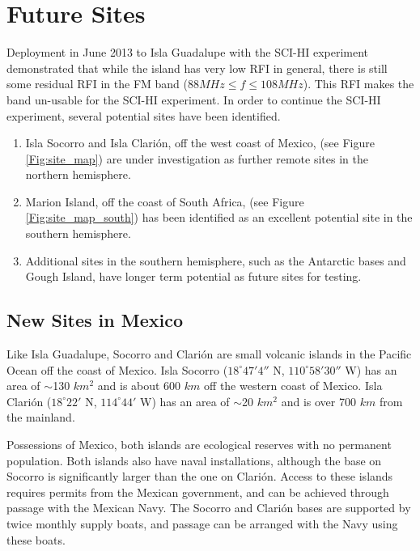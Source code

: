 \section{Future Sites}

Deployment in June 2013 to Isla Guadalupe with the SCI-HI experiment demonstrated that while the island has very low RFI in general, there is still some residual RFI in the FM band ($88 MHz \leq f \leq 108 MHz$). This RFI makes the band un-usable for the SCI-HI experiment. In order to continue the SCI-HI experiment, several potential sites have been identified.

\begin{enumerate}

\item Isla Socorro and Isla Clari\'{o}n, off the west coast of Mexico, (see Figure \ref{Fig:site_map}) are under investigation as further remote sites in the northern hemisphere.

\item Marion Island, off the coast of South Africa, (see Figure \ref{Fig:site_map_south}) has been identified as an excellent potential site in the southern hemisphere.

\item Additional sites in the southern hemisphere, such as the Antarctic bases and Gough Island, have longer term potential as future sites for testing. 

\end{enumerate}

\subsection{New Sites in Mexico}

Like Isla Guadalupe, Socorro and Clari\'{o}n are small volcanic islands in the Pacific Ocean off the coast of Mexico. Isla Socorro ($18^\circ 47' 4''$ N, $110^\circ 58' 30''$ W) has an area of $\sim$130 $km^2$ and is about 600 $km$ off the western coast of Mexico. Isla Clari\'{o}n ($18^\circ 22'$ N, $114^\circ 44'$ W) has an area of $\sim$20 $km^2$ and is over 700 $km$ from the mainland.

Possessions of Mexico, both islands are ecological reserves with no permanent population. Both islands also have naval installations, although the base on Socorro is significantly larger than the one on Clari\'{o}n. Access to these islands requires permits from the Mexican government, and can be achieved through passage with the Mexican Navy. The Socorro and Clari\'{o}n bases are supported by twice monthly supply boats, and passage can be arranged with the Navy using these boats. 

